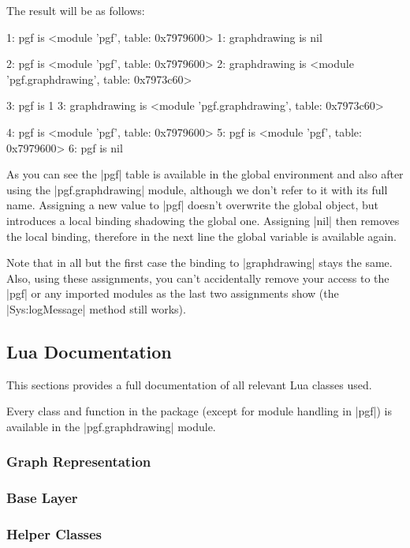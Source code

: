 The result will be as follows:

\begin{codeexample}
1: pgf is <module 'pgf', table: 0x7979600>
1: graphdrawing is nil

2: pgf is <module 'pgf', table: 0x7979600>
2: graphdrawing is <module 'pgf.graphdrawing', table: 0x7973c60>

3: pgf is 1
3: graphdrawing is <module 'pgf.graphdrawing', table: 0x7973c60>

4: pgf is <module 'pgf', table: 0x7979600>
5: pgf is <module 'pgf', table: 0x7979600>
6: pgf is nil
\end{codeexample}

As you can see the |pgf| table is available in the global environment
and also after using the |pgf.graphdrawing| module, although we don't
refer to it with its full name.  Assigning a new value to |pgf|
doesn't overwrite the global object, but introduces a local binding
shadowing the global one. Assigning |nil| then removes the local
binding, therefore in the next line the global variable is available
again.

Note that in all but the first case the binding to |graphdrawing|
stays the same.  Also, using these assignments, you can't accidentally
remove your access to the |pgf| or any imported modules as the last
two assignments show (the |Sys:logMessage| method still works).

\subsection{Lua Documentation}
This sections provides a full documentation of all relevant Lua classes
used.

Every class and function in the package (except for module handling in
|pgf|) is available in the |pgf.graphdrawing| module.

\label{section-library-graphdrawing-lua-documentation}
\subsubsection{Graph Representation}
\label{section-library-graphdrawing-lua-documentation-graphrep}





%

\subsubsection{Base Layer}

\label{section-library-graphdrawing-lua-documentation-interface}

\label{section-library-graphdrawing-lua-documentation-sys}


\subsubsection{Helper Classes}

